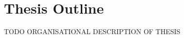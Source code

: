 \section{Thesis Outline}


\vspace{1\baselineskip}

\noindent
TODO ORGANISATIONAL DESCRIPTION OF THESIS

